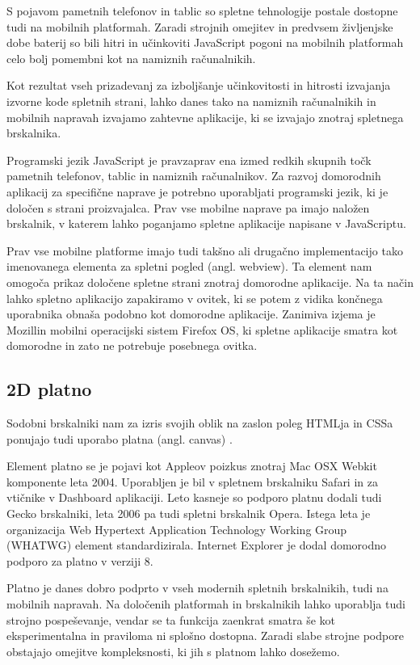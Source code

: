 S pojavom pametnih telefonov in tablic so spletne tehnologije postale dostopne tudi na mobilnih platformah. Zaradi strojnih omejitev in predvsem življenjske dobe baterij so bili hitri in učinkoviti JavaScript pogoni na mobilnih platformah celo bolj pomembni kot na namiznih računalnikih.

Kot rezultat vseh prizadevanj za izboljšanje učinkovitosti in hitrosti izvajanja izvorne kode spletnih strani, lahko danes tako na namiznih računalnikih in mobilnih napravah izvajamo zahtevne aplikacije, ki se izvajajo znotraj spletnega brskalnika.

Programski jezik JavaScript je pravzaprav ena izmed redkih skupnih točk pametnih telefonov, tablic in namiznih računalnikov. Za razvoj domorodnih aplikacij za specifične naprave je potrebno uporabljati programski jezik, ki je določen s strani proizvajalca. Prav vse mobilne naprave pa imajo naložen brskalnik, v katerem lahko poganjamo spletne aplikacije napisane v JavaScriptu.

Prav vse mobilne platforme imajo tudi takšno ali drugačno implementacijo tako imenovanega elementa za spletni pogled (angl. webview). Ta element nam omogoča prikaz določene spletne strani znotraj domorodne aplikacije. Na ta način lahko spletno aplikacijo zapakiramo v ovitek, ki se potem z vidika končnega uporabnika obnaša podobno kot domorodne aplikacije. Zanimiva izjema je Mozillin mobilni operacijski sistem Firefox OS, ki spletne aplikacije smatra kot domorodne in zato ne potrebuje posebnega ovitka.

\subsection{2D platno}
\label{sec:2dcanvas}
Sodobni brskalniki nam za izris svojih oblik na zaslon poleg HTMLja in CSSa ponujajo tudi uporabo platna (angl. canvas) \cite{canvas}. 

Element platno se je pojavi kot Appleov poizkus znotraj Mac OSX Webkit komponente leta 2004. Uporabljen je bil v spletnem brskalniku Safari in za vtičnike v Dashboard aplikaciji. Leto kasneje so podporo platnu dodali tudi Gecko brskalniki, leta 2006 pa tudi spletni brskalnik Opera. Istega leta je organizacija Web Hypertext Application Technology Working Group (WHATWG) element standardizirala. Internet Explorer je dodal domorodno podporo za platno v verziji 8.

Platno je danes dobro podprto v vseh modernih spletnih brskalnikih, tudi na mobilnih napravah. Na določenih platformah in brskalnikih lahko uporablja tudi strojno pospeševanje, vendar se ta funkcija zaenkrat smatra še kot eksperimentalna in praviloma ni splošno dostopna. Zaradi slabe strojne podpore obstajajo omejitve kompleksnosti, ki jih s platnom lahko dosežemo.

